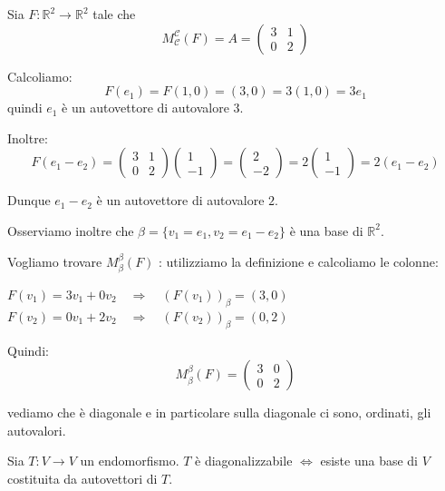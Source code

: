 \documentclass[
  a4paper,
]{article}
\begin{document}
\begin{examplebox}
Sia \(F : \mathbb{R}^2 \to \mathbb{R}^2\) tale che\\
\[
M^{\mathcal{C}}_{\mathcal{C}}(F) = A =  
\begin{pmatrix}  
3 & 1 \\  
0 & 2  
\end{pmatrix}  
\]

Calcoliamo:\\
\[
F(e_1) = F(1,0) = (3,0) = 3(1,0) = 3 e_1
\] quindi \(e_1\) è un autovettore di autovalore \(3\).

Inoltre:\\
\[
F(e_1 - e_2) =  
\begin{pmatrix}  
3 & 1 \\  
0 & 2  
\end{pmatrix}  
\begin{pmatrix}  
1 \\  
-1  
\end{pmatrix}  
=  
\begin{pmatrix}  
2 \\  
-2  
\end{pmatrix}  
=  
2  
\begin{pmatrix}  
1 \\  
-1  
\end{pmatrix}  
= 2 (e_1 - e_2) 
\]

Dunque \(e_1 - e_2\) è un autovettore di autovalore \(2\).

Osserviamo inoltre che \(\beta = \{v_1 = e_1, v_2 = e_1 - e_2\}\) è una
base di \(\mathbb{R}^2\).

Vogliamo trovare \(M^{\beta}_{\beta}(F)\) : utilizziamo la definizione e
calcoliamo le colonne:

\(F(v_1) = 3 v_1 + 0 v_2 \quad\Rightarrow\quad (F(v_1))_{\beta} = (3, 0)\)
\(F(v_2) = 0 v_1 + 2 v_2 \quad\Rightarrow\quad (F(v_2))_{\beta} = (0, 2)\)

Quindi: \[
M^{{\beta}}_{\beta}(F) =
\begin{pmatrix}  
3 & 0 \\  
0 & 2  
\end{pmatrix}  
\]

vediamo che è diagonale e in particolare sulla diagonale ci sono,
ordinati, gli autovalori.
\end{examplebox}

\begin{propositionbox}
Sia \(T: V \to V\) un endomorfismo. \(T\) è diagonalizzabile \(\iff\)
esiste una base di \(V\) costituita da autovettori di \(T\).
\end{propositionbox}
\end{document}
